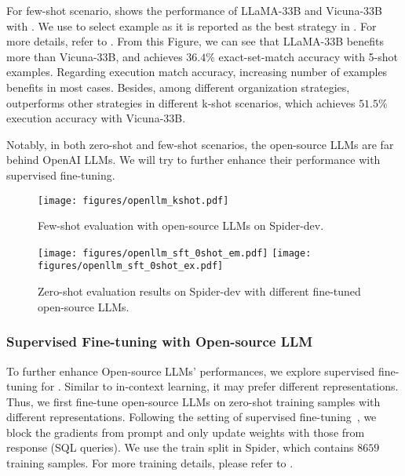 For few-shot scenario,  shows the performance of LLaMA-33B and Vicuna-33B with \absqlprompt.
We use \pqsselector to select example as it is reported as the best strategy in . 
For more details, refer to . 
From this Figure, we can see that LLaMA-33B benefits more than Vicuna-33B, and achieves $36.4\%$ exact-set-match accuracy with 5-shot \fiorg examples. 
Regarding execution match accuracy, increasing number of examples benefits \nlsql in most cases. 
Besides, among different organization strategies, \fiorg outperforms other strategies in different k-shot scenarios, which achieves $51.5\%$ execution accuracy with Vicuna-33B. 

Notably, in both zero-shot and few-shot scenarios, the open-source LLMs are far behind OpenAI LLMs. 
We will try to further enhance their performance with supervised fine-tuning.

\begin{figure}[t]
    \centering
    \texttt{[image: figures/openllm\_kshot.pdf]}
    \caption{Few-shot evaluation with open-source LLMs on Spider-dev.}
	\label{fig:kshot_llms}
\end{figure}

\begin{figure*}[th]
    \centering
    \texttt{[image: figures/openllm\_sft\_0shot\_em.pdf]}
    \texttt{[image: figures/openllm\_sft\_0shot\_ex.pdf]}
	\caption{Zero-shot evaluation results on Spider-dev with different fine-tuned open-source LLMs.}
	\label{fig:sft_each_prompt_spider}
\end{figure*}

\subsubsection{Supervised Fine-tuning with Open-source LLM}

To further enhance Open-source LLMs' performances, we explore supervised fine-tuning for \nlsql. 
Similar to in-context learning, it may prefer different representations. 
Thus, we first fine-tune open-source LLMs on zero-shot training samples with different representations. 
Following the setting of supervised fine-tuning~\cite{instructgpt, alpaca}, we block the gradients from prompt and only update weights with those from response (SQL queries). 
We use the train split in Spider, which contains $8659$ training samples. 
For more training details, please refer to .


